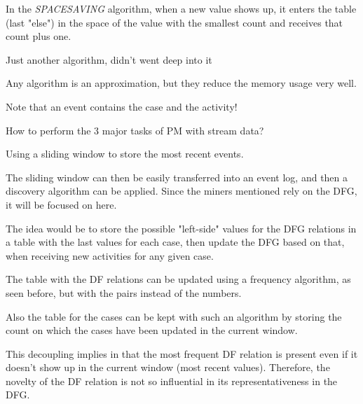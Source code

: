 \nextslides[until=64]

In the \emph{SPACESAVING} algorithm, when a new value shows up, it enters the table (last "else") in the space of the value with the smallest count and receives that count plus one.

\nextslides[until=66]

Just another algorithm, didn't went deep into it

\nextslides[until=68]

Any algorithm is an approximation, but they reduce the memory usage very well.

\nextslides[slide=70,until=72]

Note that an event contains the case and the activity!

How to perform the 3 major tasks of PM with stream data?

\nextslides[until=78,highlight=78]

\nextslides[until=88,highlight=88]

Using a sliding window to store the most recent events.

\nextslides[until=92]

The sliding window can then be easily transferred into an event log, and then a discovery algorithm can be applied. Since the miners mentioned rely on the DFG, it will be focused on here.

\nextslides[until=94,highlight=94]

The idea would be to store the possible "left-side" values for the DFG relations in a table with the last values for each case, then update the DFG based on that, when receiving new activities for any given case.

\nextslides[until=108,highlight=108]

The table with the DF relations can be updated using a frequency algorithm, as seen before, but with the pairs instead of the numbers.

\nextslides[until=111,highlight=111] 

Also the table for the cases can be kept with such an algorithm by storing the count on which the cases have been updated in the current window.

\nextslides

This decoupling implies in that the most frequent DF relation is present even if it doesn't show up in the current window (most recent values). Therefore, the novelty of the DF relation is not so influential in its representativeness in the DFG.

